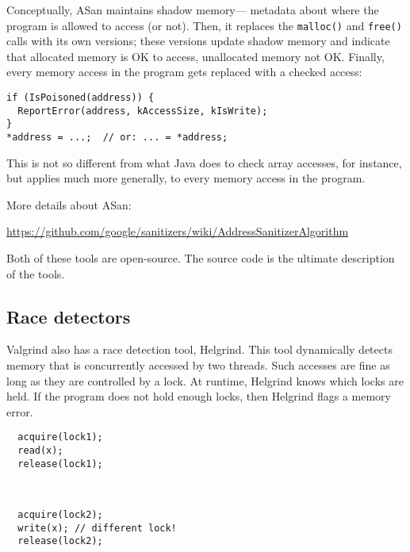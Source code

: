 \documentclass[11pt]{article}
\begin{document}
Conceptually, ASan maintains shadow memory---
metadata about where the program is allowed to access (or not).
Then, it replaces the {\tt malloc()} and {\tt free()}
calls with its own versions; these versions update shadow memory and indicate
that allocated memory is OK to access, unallocated memory not OK. 
Finally, every memory access in the program gets replaced with a checked access:
\begin{lstlisting}
if (IsPoisoned(address)) {
  ReportError(address, kAccessSize, kIsWrite);
}
*address = ...;  // or: ... = *address;
\end{lstlisting}
This is not so different from what Java does to check array accesses, for instance,
but applies much more generally, to every memory access in the program.

More details about ASan:
\vspace*{-1em}
\begin{center}
\url{https://github.com/google/sanitizers/wiki/AddressSanitizerAlgorithm}
\end{center}
Both of these tools are open-source. The source code is the ultimate description of the tools.

\subsection*{Race detectors}
Valgrind also has a race detection tool, Helgrind. This tool dynamically detects
memory that is concurrently accessed by two threads. Such accesses are fine as long
as they are controlled by a lock. At runtime, Helgrind knows which locks are held.
If the program does not hold enough locks, then Helgrind flags a memory error.

\hspace*{.2\textwidth}\begin{minipage}{.4\textwidth}
\begin{lstlisting}
  acquire(lock1);
  read(x);
  release(lock1);
\end{lstlisting}
\end{minipage}\
\begin{minipage}{.4\textwidth}
\begin{lstlisting}
  acquire(lock2);
  write(x); // different lock!
  release(lock2);
\end{lstlisting}
\end{minipage}


\end{document}
